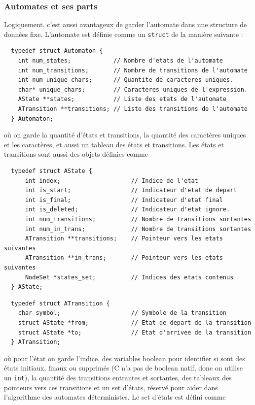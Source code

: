 \documentclass[12pt]{article}
\begin{document}
  \subsubsection*{Automates et ses parts}
  Logiquement, c'est aussi avantageux de garder l'automate dans une structure de données fixe. L'automate est définie comme un \texttt{struct} de la manière suivante :
  \begin{lstlisting}
  typedef struct Automaton {
    int num_states;            // Nombre d'etats de l'automate
    int num_transitions;       // Nombre de transitions de l'automate
    int num_unique_chars;      // Quantite de caracteres uniques.
    char* unique_chars;        // Caracteres uniques de l'expression.
    AState **states;           // Liste des etats de l'automate
    ATransition **transitions; // Liste des transitions de l'automate
  } Automaton;
  \end{lstlisting}

  \noindent où on garde la quantité d'états et transitions, la quantité des caractères uniques et les caractères, et aussi un tableau des états et transitions. Les états et transitions sont aussi des objets définies comme

  \begin{lstlisting}
  typedef struct AState {
      int index;                    // Indice de l'etat
      int is_start;                 // Indicateur d'etat de depart
      int is_final;                 // Indicateur d'etat final
      int is_deleted;               // Indicateur d'etat ignore.
      int num_transitions;          // Nombre de transitions sortantes
      int num_in_trans;             // Nombre de transitions sortantes
      ATransition **transitions;    // Pointeur vers les etats suivantes
      ATransition **in_trans;       // Pointeur vers les etats suivantes
      NodeSet *states_set;          // Indices des etats contenus
  } AState;
  \end{lstlisting}
  \begin{lstlisting}
  typedef struct ATransition {
    char symbol;                    // Symbole de la transition
    struct AState *from;            // Etat de depart de la transition
    struct AState *to;              // Etat d'arrivee de la transition
  } ATransition;
  \end{lstlisting}

  \noindent où pour l'état on garde l'indice, des variables boolean pour identifier si sont des états initiaux, finaux ou supprimés (C n'a pas de boolean natif, donc on utilise un \texttt{int}), la quantité des transitions entrantes et sortantes, des tableaux des pointeurs vers ces transitions et un set d'états, réservé pour aider dans l'algorithme des automates déterministes. Le set d'états est défini comme
\end{document}
